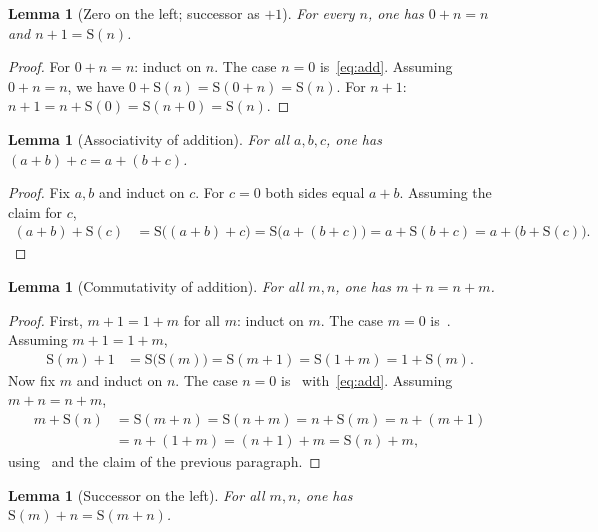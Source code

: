 \documentclass[11pt,reqno]{amsart}
\theoremstyle{plain}
\newtheorem{lemma}[theorem]{Lemma}
\theoremstyle{definition}
\theoremstyle{remark}
\newcommand{\Suc}{\mathrm{S}}
\numberwithin{equation}{section}
\begin{document}
\begin{lemma}[Zero on the left; successor as \(+1\)]
\label{lem:add-basic}
For every \(n\), one has \(0+n=n\) and \(n+1=\Suc(n)\).
\end{lemma}

\begin{proof}
For \(0+n=n\): induct on \(n\). The case \(n=0\) is~\eqref{eq:add}.
Assuming \(0+n=n\), we have
\(0+\Suc(n)=\Suc(0+n)=\Suc(n)\). For \(n+1\):
\(n+1=n+\Suc(0)=\Suc(n+0)=\Suc(n)\).
\end{proof}

\begin{lemma}[Associativity of addition]
\label{lem:add-assoc}
For all \(a,b,c\), one has \((a+b)+c=a+(b+c)\).
\end{lemma}

\begin{proof}
Fix \(a,b\) and induct on \(c\). For \(c=0\) both sides equal
\(a+b\). Assuming the claim for \(c\),
\begin{align*}
  (a+b)+\Suc(c)
    &=\Suc\bigl((a+b)+c\bigr)
     =\Suc\bigl(a+(b+c)\bigr)
     =a+\Suc(b+c)
     =a+\bigl(b+\Suc(c)\bigr).
\end{align*}
\end{proof}

\begin{lemma}[Commutativity of addition]
\label{lem:add-comm}
For all \(m,n\), one has \(m+n=n+m\).
\end{lemma}

\begin{proof}
First, \(m+1=1+m\) for all \(m\): induct on \(m\). The case \(m=0\)
is~. Assuming \(m+1=1+m\),
\begin{align*}
  \Suc(m)+1
    &=\Suc\bigl(\Suc(m)\bigr)
     =\Suc(m+1)
     =\Suc(1+m)
     =1+\Suc(m).
\end{align*}
Now fix \(m\) and induct on \(n\). The case \(n=0\)
is~ with~\eqref{eq:add}. Assuming
\(m+n=n+m\),
\begin{align*}
  m+\Suc(n)
    &=\Suc(m+n)=\Suc(n+m)=n+\Suc(m)=n+(m+1)\\
    &=n+(1+m)=(n+1)+m=\Suc(n)+m,
\end{align*}
using~ and the claim of the previous paragraph.
\end{proof}

\begin{lemma}[Successor on the left]
\label{lem:succ-add}
For all \(m,n\), one has \(\Suc(m)+n=\Suc(m+n)\).
\end{lemma}
\end{document}
